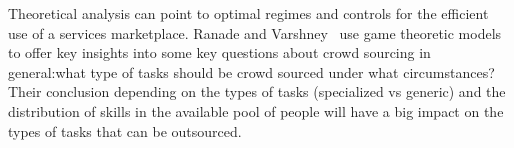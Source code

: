  Theoretical analysis can point to optimal regimes and controls for the efficient use of a services marketplace. Ranade and Varshney~\cite{glo-ranade} use game theoretic models to offer key insights into some key questions about crowd sourcing in general:what type of tasks should be crowd sourced under what circumstances? Their conclusion depending on the types of tasks (specialized vs generic) and the distribution of skills in the available pool of people will have a big impact on the types of tasks that can be outsourced.

\label{sec:global}



